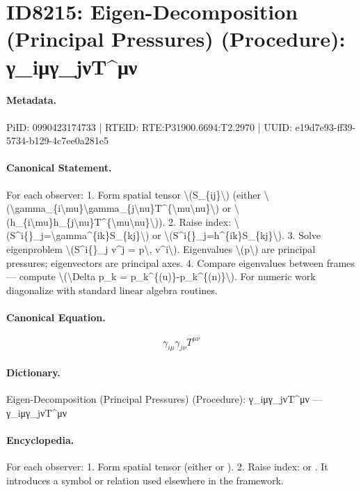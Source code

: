\section*{ID8215: Eigen-Decomposition (Principal Pressures) (Procedure): γ\_iμγ\_jνT\textasciicircum{}μν}
\paragraph{Metadata.}
PiID: 0990423174733 | RTEID: RTE:P31900.6694:T2.2970 | UUID: e19d7e93-ff39-5734-b129-4c7ee0a281e5

\paragraph{Canonical Statement.}
For each observer: 1. Form spatial tensor \textbackslash{}(S\_\{ij\}\textbackslash{}) (either \textbackslash{}(\textbackslash{}gamma\_\{i\textbackslash{}mu\}\textbackslash{}gamma\_\{j\textbackslash{}nu\}T\textasciicircum{}\{\textbackslash{}mu\textbackslash{}nu\}\textbackslash{}) or \textbackslash{}(h\_\{i\textbackslash{}mu\}h\_\{j\textbackslash{}nu\}T\textasciicircum{}\{\textbackslash{}mu\textbackslash{}nu\}\textbackslash{})). 2. Raise index: \textbackslash{}(S\textasciicircum{}i\{\}\_j=\textbackslash{}gamma\textasciicircum{}\{ik\}S\_\{kj\}\textbackslash{}) or \textbackslash{}(S\textasciicircum{}i\{\}\_j=h\textasciicircum{}\{ik\}S\_\{kj\}\textbackslash{}). 3. Solve eigenproblem \textbackslash{}(S\textasciicircum{}i\{\}\_j v\textasciicircum{}j = p\textbackslash{}, v\textasciicircum{}i\textbackslash{}). Eigenvalues \textbackslash{}(p\textbackslash{}) are principal pressures; eigenvectors are principal axes. 4. Compare eigenvalues between frames — compute \textbackslash{}(\textbackslash{}Delta p\_k = p\_k\textasciicircum{}\{(u)\}-p\_k\textasciicircum{}\{(n)\}\textbackslash{}). For numeric work diagonalize with standard linear algebra routines.

\paragraph{Canonical Equation.}
\[
\gamma_{i\mu}\gamma_{j\nu}T^{\mu\nu}
\]

\paragraph{Dictionary.}
Eigen-Decomposition (Principal Pressures) (Procedure): γ\_iμγ\_jνT\textasciicircum{}μν — γ\_iμγ\_jνT\textasciicircum{}μν

\paragraph{Encyclopedia.}
For each observer: 1. Form spatial tensor (either or ). 2. Raise index: or . It introduces a symbol or relation used elsewhere in the framework.

